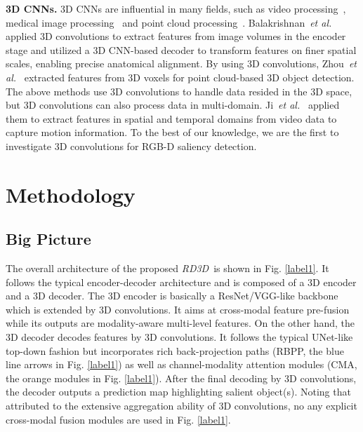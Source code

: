 \documentclass[letterpaper]{article}
\def\ourmodel{\emph{RD3D}}
\begin{document}
\noindent \textbf{3D CNNs.} 3D CNNs are influential in many fields, such as video processing~\cite{ji20123d,tran2015learning}, medical image processing~\cite{balakrishnan2019voxelmorph} and point cloud processing~\cite{zhou2018voxelnet}. Balakrishnan~\textit{et al.}~\cite{balakrishnan2019voxelmorph} applied 3D convolutions to extract features from image volumes in the encoder stage and utilized a 3D CNN-based decoder to transform features on finer spatial scales, enabling precise anatomical alignment. By using 3D convolutions, Zhou~\textit{et al.}~\cite{zhou2018voxelnet} extracted features from 3D voxels for point cloud-based 3D object detection. The above methods use 3D convolutions to handle data resided in the 3D space, but 3D convolutions can also process data in multi-domain. Ji~\textit{et al.}~\cite{ji20123d} applied them to extract features in spatial and temporal domains from video data to capture motion information. To the best of our knowledge, we are the first to investigate 3D convolutions for RGB-D saliency detection.



\section{Methodology}
\subsection{Big Picture}
The overall architecture of the proposed \ourmodel~is shown in Fig. \ref{label1}. It follows the typical encoder-decoder architecture and is composed of a 3D encoder and a 3D decoder. The 3D encoder is basically a ResNet/VGG-like backbone which is extended by 3D convolutions. It aims at cross-modal feature pre-fusion while its outputs are modality-aware multi-level features. On the other hand, the 3D decoder decodes features by 3D convolutions. It follows the typical UNet-like top-down fashion but incorporates rich back-projection paths (RBPP, the blue line arrows in Fig. \ref{label1}) as well as channel-modality attention modules (CMA, the orange modules in Fig. \ref{label1}). After the final decoding by 3D convolutions, the decoder outputs a prediction map highlighting salient object(s). Noting that attributed to the extensive aggregation ability of 3D convolutions, no any explicit cross-modal fusion modules are used in Fig. \ref{label1}.
\end{document}
